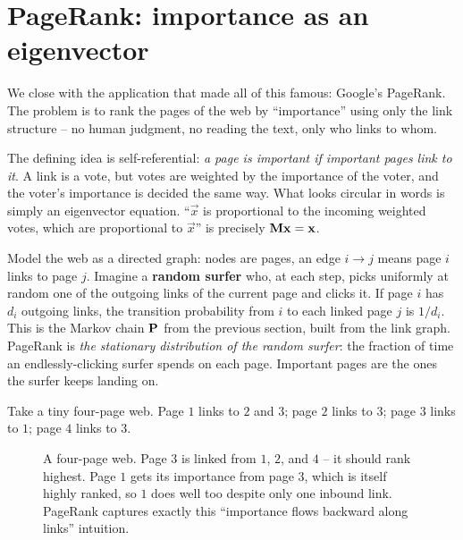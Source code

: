 \section{PageRank: importance as an eigenvector}
\label{ch35:pagerank}

We close with the application that made all of this famous: Google's PageRank. The problem
is to rank the pages of the web by ``importance'' using only the link structure -- no human
judgment, no reading the text, only who links to whom.

\begin{intuitionbox}
The defining idea is self-referential: \emph{a page is important
if important pages link to it}. A link is a vote, but votes are weighted by the importance
of the voter, and the voter's importance is decided the same way. What looks circular in words
is simply an eigenvector equation. ``$\vec{x}$ is proportional to the
incoming weighted votes, which are proportional to $\vec{x}$'' is precisely
$\mathbf{M}\mathbf{x} = \mathbf{x}$.
\end{intuitionbox}

Model the web as a directed graph: nodes are pages, an edge $i \to j$ means page $i$ links
to page $j$. Imagine a \textbf{random surfer} who, at each step, picks uniformly at random
one of the outgoing links of the current page and clicks it. If page $i$ has $d_i$ outgoing
links, the transition probability from $i$ to each linked page $j$ is $1/d_i$. This is
the Markov chain $\mathbf{P}$ from the previous section, built from the link graph. PageRank is
\emph{the stationary distribution of the random surfer}: the fraction of time an
endlessly-clicking surfer spends on each page. Important pages are the ones the surfer keeps
landing on.

Take a tiny four-page web. Page $1$ links to $2$ and $3$; page $2$ links to $3$; page $3$
links to $1$; page $4$ links to $3$.

\begin{figure}[H]
\centering
{}
\caption{A four-page web. Page $3$ is linked from $1$, $2$, and $4$ -- it should rank
highest. Page $1$ gets its importance from page $3$, which is itself highly ranked, so $1$
does well too despite only one inbound link. PageRank captures exactly this ``importance
flows backward along links'' intuition.}
\label{ch35:fig-web}
\end{figure}


